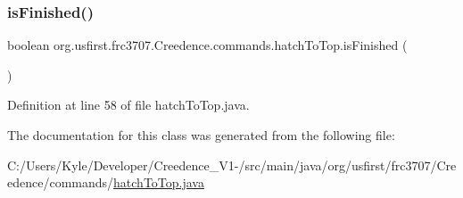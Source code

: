 \subsubsection{\texorpdfstring{isFinished()}{isFinished()}}
{\footnotesize\ttfamily boolean org.\+usfirst.\+frc3707.\+Creedence.\+commands.\+hatch\+To\+Top.\+is\+Finished (\begin{DoxyParamCaption}{ }\end{DoxyParamCaption})\hspace{0.3cm}{\ttfamily [protected]}}



Definition at line 58 of file hatch\+To\+Top.\+java.



The documentation for this class was generated from the following file\+:\begin{DoxyCompactItemize}
\item 
C\+:/\+Users/\+Kyle/\+Developer/\+Creedence\+\_\+\+V1-\//src/main/java/org/usfirst/frc3707/\+Creedence/commands/\mbox{\hyperlink{hatch_to_top_8java}{hatch\+To\+Top.\+java}}\end{DoxyCompactItemize}
